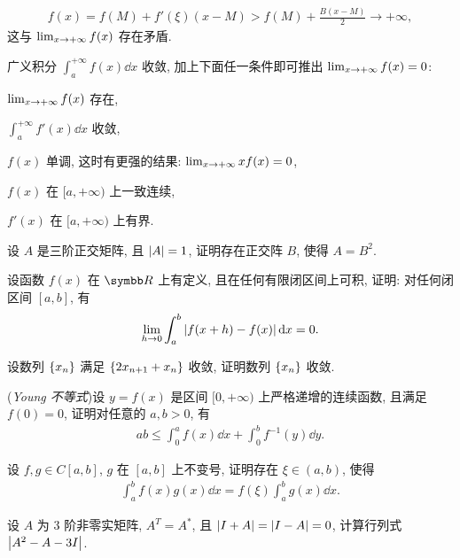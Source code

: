 \begin{exercise}[series=exer]
\begin{answer}
\begin{answersheet}
            \begin{align*}
                f(x) = f(M) + f'(\xi)(x - M) > f(M) + \frac{B(x - M)}{2} \to +\infty,
            \end{align*}
            这与 $ \lim_{x \to +\infty}f(x) $ 存在矛盾. 
        \end{answersheet}
    \end{answer}
    \item 广义积分 $ \int_{a}^{+\infty} f(x) \dd{x} $ 收敛, 加上下面任一条件即可推出 $ \lim_{x \to +\infty} f(x) = 0 $:
    \begin{exercise}
        \item $ \lim_{x \to +\infty} f(x) $ 存在,
        \item $ \int_{a}^{+\infty} f'(x) \dd{x} $ 收敛,
        \item $ f(x) $ 单调, 这时有更强的结果: $ \lim_{x \to +\infty} xf(x) = 0 $,
        \item $ f(x) $ 在 $ [a, +\infty) $ 上一致连续,
        \item $ f'(x) $ 在 $ [a, +\infty) $ 上有界. 
    \end{exercise}
    \item 设 $ A $ 是三阶正交矩阵, 且 $ \abs{A} = 1 $, 证明存在正交阵 $ B $, 使得 $ A = B^{2} $.  
    \item 设函数 $ f(x) $ 在 $ \R $ 上有定义, 且在任何有限闭区间上可积, 证明: 对任何闭区间 $ [a, b] $, 有
    \begin{align*}
        \lim_{h \to 0} \int_{a}^{b} \abs{f(x + h) - f(x)} \dd{x} = 0.
    \end{align*}
    \item 设数列 $ \qty{x_{n}} $ 满足 $ \qty{2x_{n+1} + x_{n}} $ 收敛, 证明数列 $ \qty{x_{n}} $ 收敛. 
    \item (\emph{Young 不等式})设 $ y=f(x) $ 是区间 $ [0, +\infty) $ 上严格递增的连续函数, 且满足 $ f(0) = 0 $, 证明对任意的 $ a, b > 0 $, 有
    \begin{align*}
        ab \le \int_{0}^{a}f(x) \dd{x} + \int_{0}^{b} f^{-1}(y) \dd{y}.
    \end{align*}
    \item 设 $ f, g \in C[a, b] $, $ g $ 在 $ [a, b] $ 上不变号, 证明存在 $ \xi\in (a, b) $, 使得
    \begin{align*}
        \int_{a}^{b} f(x)g(x) \dd{x} = f(\xi)\int_{a}^{b} g(x) \dd{x}.
    \end{align*}   
    \item 设 $ A $ 为 $ 3 $ 阶非零实矩阵, $ A^{T} = A^{*} $, 且 $ \abs{I + A} = \abs{I - A} = 0 $, 计算行列式 $ \abs{A^{2} - A - 3I} $.

\end{exercise}
